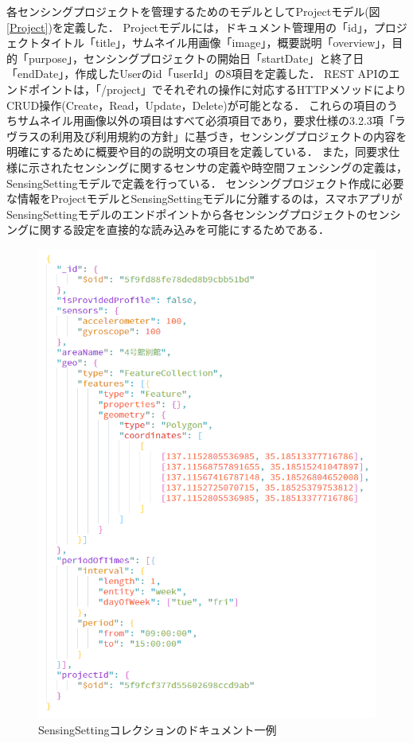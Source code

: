 各センシングプロジェクトを管理するためのモデルとしてProjectモデル(図\ref{Project})を定義した．
Projectモデルには，ドキュメント管理用の「id」，プロジェクトタイトル「title」，サムネイル用画像「image」，概要説明「overview」，目的「purpose」，センシングプロジェクトの開始日「startDate」と終了日「endDate」，作成したUserのid「userId」の8項目を定義した．
REST APIのエンドポイントは，「/project」でそれぞれの操作に対応するHTTPメソッドによりCRUD操作(Create，Read，Update，Delete)が可能となる．
これらの項目のうちサムネイル用画像以外の項目はすべて必須項目であり，要求仕様の3.2.3項「ラヴラスの利用及び利用規約の方針」に基づき，センシングプロジェクトの内容を明確にするために概要や目的の説明文の項目を定義している．
また，同要求仕様に示されたセンシングに関するセンサの定義や時空間フェンシングの定義は，SensingSettingモデルで定義を行っている．
センシングプロジェクト作成に必要な情報をProjectモデルとSensingSettingモデルに分離するのは，スマホアプリがSensingSettingモデルのエンドポイントから各センシングプロジェクトのセンシングに関する設定を直接的な読み込みを可能にするためである．

\begin{figure}[H]
  \centering
  \includegraphics[width=120mm]{SensingSetting.png}
  \caption{SensingSettingコレクションのドキュメント一例}
  \label{SensingSetting}
\end{figure}

